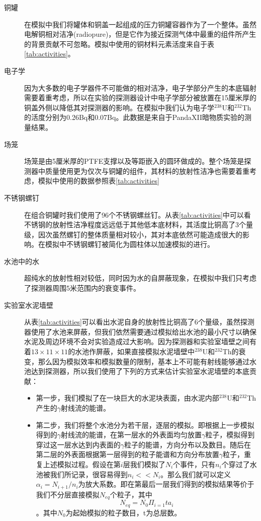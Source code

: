 \begin{description}
    \item[铜罐] 在模拟中我们将罐体和铜盖一起组成的压力铜罐容器作为了一个整体。虽然电解铜相对洁净(radiopure)，但是它作为接近探测气体中最重的组件所产生的背景贡献不可忽略。模拟中使用的铜材料元素活度来自于表\ref{tab:activities}。
    \item[电子学] 因为大多数的电子学器件不可能做的相对洁净，电子学部分产生的本底辐射需要着重考虑，所以在实验的探测器设计中电子学部分被放置在15厘米厚的铜盖外侧以降低其对探测器的影响。在模拟中我们认为电子学$^{238}$U和$^{232}$Th的活度分别为0.26Bq和0.07Bq。此数据是来自于PandaXII暗物质实验的测量结果。
    \item[场笼]场笼是由5厘米厚的PTFE支撑以及等距嵌入的圆环做成的。整个场笼是探测器中质量使用更为仅次与铜罐的组件，其材料的放射性洁净也需要着重考虑，模拟中使用的数据参照表\ref{tab:activities}
    \item[不锈钢螺钉]在组合铜罐时我们使用了96个不锈钢螺丝钉。从表\ref{tab:activities}中可以看不锈钢的放射性洁净程度远远低于其他低本底材料，其活度比铜高了3个量级，因次虽然螺钉的整体质量相对较小，其对本底依然可能造成很大的影响。在模拟中不锈钢螺钉被简化为圆柱体以加速模拟的进行。
    \item[水池中的水]超纯水的放射性相对较低，同时因为水的自屏蔽现象，在模拟中我们只考虑了探测器周围5米范围内的衰变事件。
    \item[实验室水泥墙壁]从表\ref{tab:activities}可以看出水泥自身的放射性比铜高了6个量级，虽然探测器使用了水池来屏蔽，但我们依然需要通过模拟给出水池的最小尺寸以确保水泥及周边环境不会对实验造成过大影响。因为探测器和实验室墙壁之间有着$13\times11\times11$的水池作屏蔽，如果直接模拟水泥墙壁中$^{238}$U和$^{232}$Th的衰变，那么因为模拟效率和模拟数量的限制，基本上不可能有射线能够通过水池达到探测器，所以我们使用了下列的方式来估计实验室水泥墙壁的本底贡献：
    \begin{itemize}
        \item 第一步，我们模拟了在一块巨大的水泥块表面，由水泥内部$^{238}$U和$^{232}$Th产生的$\gamma$射线流的能谱。
        \item 第二步，我们将整个水池分为若干层，逐层的模拟。即根据上一步模拟得到的$\gamma$射线流的能谱，在第一层水的外表面均匀放置$\gamma$粒子，模拟得到穿过这一层水达到内表面的$\gamma$粒子的能谱，方向分布以及数目。随后在第二层的外表面根据第一层得到的粒子能谱和方向分布放置$\gamma$粒子，重复上述模拟过程。假设在第$i$层我们模拟了$N_i$个事件，只有$n_i$个穿过了水池被我们所记录，很容易得到$n_i<<N_i$。那么我们就可以定义$\alpha_i=N_{i+1}/n_i$为放大系数。即在第最后一层我们得到的模拟结果等价于我们不分层直接模拟$N_{eq}$个粒子，其中$$N_{eq}=N_0\Pi_{i=1}{t}a_i$$。其中$N_0$为起始模拟的粒子数目，t为总层数。

\end{itemize}
\end{description}
